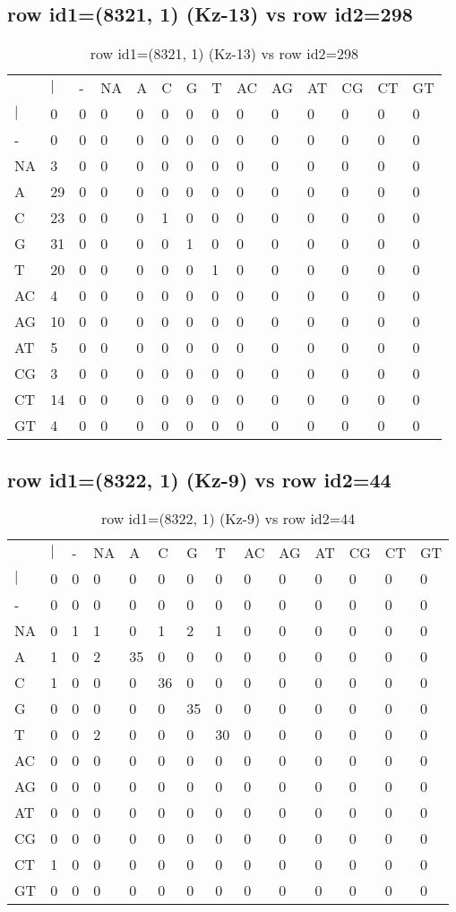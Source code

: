 \subsection{row id1=(8321, 1) (Kz-13) vs row id2=298}
\begin{center}
\begin{longtable}{|l|l|l|l|l|l|l|l|l|l|l|l|l|l|}
\caption{row id1=(8321, 1) (Kz-13) vs row id2=298} \label{table_dm314}\\
\hline
\\
\hline
&$|$&-&NA&A&C&G&T&AC&AG&AT&CG&CT&GT\\
$|$&0&0&0&0&0&0&0&0&0&0&0&0&0\\
-&0&0&0&0&0&0&0&0&0&0&0&0&0\\
NA&3&0&0&0&0&0&0&0&0&0&0&0&0\\
A&29&0&0&0&0&0&0&0&0&0&0&0&0\\
C&23&0&0&0&1&0&0&0&0&0&0&0&0\\
G&31&0&0&0&0&1&0&0&0&0&0&0&0\\
T&20&0&0&0&0&0&1&0&0&0&0&0&0\\
AC&4&0&0&0&0&0&0&0&0&0&0&0&0\\
AG&10&0&0&0&0&0&0&0&0&0&0&0&0\\
AT&5&0&0&0&0&0&0&0&0&0&0&0&0\\
CG&3&0&0&0&0&0&0&0&0&0&0&0&0\\
CT&14&0&0&0&0&0&0&0&0&0&0&0&0\\
GT&4&0&0&0&0&0&0&0&0&0&0&0&0\\
\hline
\end{longtable}
\end{center}

\subsection{row id1=(8322, 1) (Kz-9) vs row id2=44}
\begin{center}
\begin{longtable}{|l|l|l|l|l|l|l|l|l|l|l|l|l|l|}
\caption{row id1=(8322, 1) (Kz-9) vs row id2=44} \label{table_dm316}\\
\hline
\\
\hline
&$|$&-&NA&A&C&G&T&AC&AG&AT&CG&CT&GT\\
$|$&0&0&0&0&0&0&0&0&0&0&0&0&0\\
-&0&0&0&0&0&0&0&0&0&0&0&0&0\\
NA&0&1&1&0&1&2&1&0&0&0&0&0&0\\
A&1&0&2&35&0&0&0&0&0&0&0&0&0\\
C&1&0&0&0&36&0&0&0&0&0&0&0&0\\
G&0&0&0&0&0&35&0&0&0&0&0&0&0\\
T&0&0&2&0&0&0&30&0&0&0&0&0&0\\
AC&0&0&0&0&0&0&0&0&0&0&0&0&0\\
AG&0&0&0&0&0&0&0&0&0&0&0&0&0\\
AT&0&0&0&0&0&0&0&0&0&0&0&0&0\\
CG&0&0&0&0&0&0&0&0&0&0&0&0&0\\
CT&1&0&0&0&0&0&0&0&0&0&0&0&0\\
GT&0&0&0&0&0&0&0&0&0&0&0&0&0\\
\hline
\end{longtable}
\end{center}


